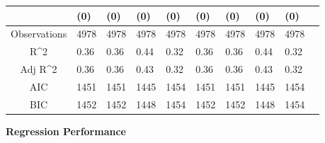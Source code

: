 \documentclass{article}
\begin{document}
\begin{table}[H]
\begin{tabular}{|clllllllll|}
   & (0) & (0) & (0) & (0) & (0) & (0) & (0) & (0) & \\ 
  \hline 
 Observations & 4978 & 4978 & 4978 & 4978 & 4978 & 4978 & 4978 & 4978 & \\ 
  R^2 & 0.36 & 0.36 & 0.44 & 0.32 & 0.36 & 0.36 & 0.44 & 0.32 & \\ 
  Adj R^2 & 0.36 & 0.36 & 0.43 & 0.32 & 0.36 & 0.36 & 0.43 & 0.32 & \\ 
  AIC & 1451 & 1451 & 1445 & 1454 & 1451 & 1451 & 1445 & 1454 & \\ 
  BIC & 1452 & 1452 & 1448 & 1454 & 1452 & 1452 & 1448 & 1454 & \\ 
   \hline
\end{tabular}
 
\end{table}


\newpage
{\large \textbf{Regression Performance} }%
\end{document}
